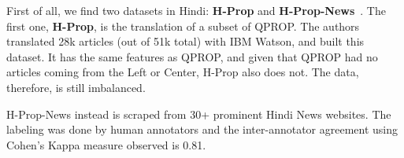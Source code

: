 First of all, we find two datasets in Hindi: \textbf{H-Prop} and \textbf{H-Prop-News}~\citep{chaudhari2022h,chaudhari_deptii_2022_5828240}.
The first one, \textbf{H-Prop}, is the translation of a subset of QPROP. The authors translated 28k articles (out of 51k total) with IBM Watson, and built this dataset. It has the same features as QPROP, and given that QPROP had no articles coming from the Left or Center, H-Prop also does not. The data, therefore, is still imbalanced.

H-Prop-News instead is scraped from 30+ prominent Hindi News websites. The labeling was done by human annotators and the inter-annotator agreement using Cohen’s Kappa measure observed is 0.81.

\begin{table}[!htbp]
    \centering
\end{table}
